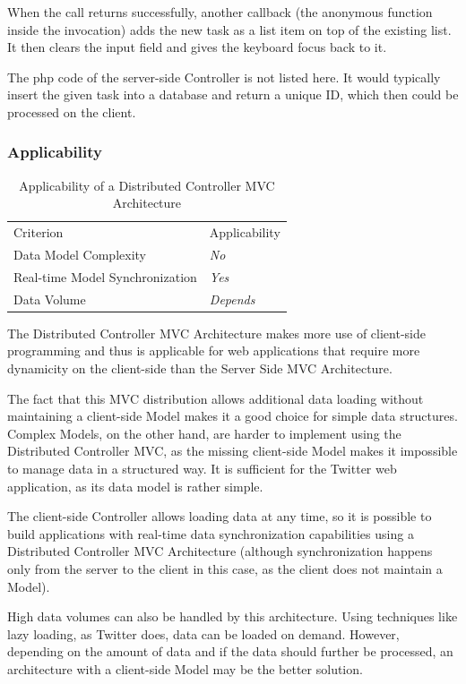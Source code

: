 When the call returns successfully, another callback (the anonymous function inside the  invocation) adds the new task as a list item on top of the existing list. It then clears the input field and gives the keyboard focus back to it.

The \ac{php} code of the server-side Controller is not listed here. It would typically insert the given task into a database and return a unique ID, which then could be processed on the client.


\subsubsection{Applicability}
\begin{table}[H]
	\centering
	\begin{tabular}{l l}
\rowcolor{lightgray}
Criterion & Applicability\\
Data Model Complexity & \emph{No}\\
Real-time Model Synchronization & \emph{Yes}\\
Data Volume & \emph{Depends}\\
	\end{tabular}
	\caption{Applicability of a Distributed Controller MVC Architecture}
\end{table}
The Distributed Controller MVC Architecture makes more use of client-side programming and thus is applicable for web applications that require more dynamicity on the client-side than the Server Side MVC Architecture.

The fact that this MVC distribution allows additional data loading without maintaining a client-side Model makes it a good choice for simple data structures. Complex Models, on the other hand, are harder to implement using the Distributed Controller MVC, as the missing client-side Model makes it impossible to manage data in a structured way. It is sufficient for the Twitter web application, as its data model is rather simple.

The client-side Controller allows loading data at any time, so it is possible to build applications with real-time data synchronization capabilities using a Distributed Controller MVC Architecture (although synchronization happens only from the server to the client in this case, as the client does not maintain a Model).

High data volumes can also be handled by this architecture. Using techniques like lazy loading, as Twitter does, data can be loaded on demand. However, depending on the amount of data and if the data should further be processed, an architecture with a client-side Model may be the better solution.

